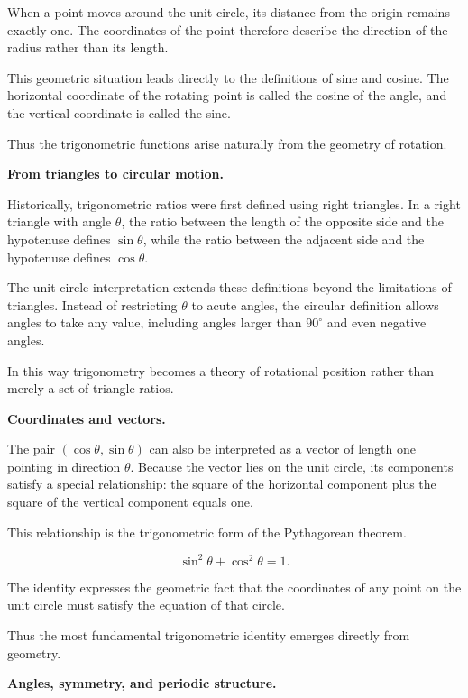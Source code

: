 \documentclass[11pt, openany]{book}
\theoremstyle{plain}
\theoremstyle{definition}
\theoremstyle{remark}
\begin{document}
When a point moves around the unit circle, its distance from the origin
remains exactly one. The coordinates of the point therefore describe the
direction of the radius rather than its length.

This geometric situation leads directly to the definitions of sine and
cosine. The horizontal coordinate of the rotating point is called the
cosine of the angle, and the vertical coordinate is called the sine.

Thus the trigonometric functions arise naturally from the geometry of
rotation.

\medskip

\textbf{From triangles to circular motion.}

Historically, trigonometric ratios were first defined using right
triangles. In a right triangle with angle $\theta$, the ratio between the
length of the opposite side and the hypotenuse defines $\sin\theta$,
while the ratio between the adjacent side and the hypotenuse defines
$\cos\theta$.

The unit circle interpretation extends these definitions beyond the
limitations of triangles. Instead of restricting $\theta$ to acute
angles, the circular definition allows angles to take any value,
including angles larger than $90^\circ$ and even negative angles.

In this way trigonometry becomes a theory of rotational position rather
than merely a set of triangle ratios.

\medskip

\textbf{Coordinates and vectors.}

The pair $(\cos\theta,\sin\theta)$ can also be interpreted as a vector of
length one pointing in direction $\theta$. Because the vector lies on the
unit circle, its components satisfy a special relationship: the square
of the horizontal component plus the square of the vertical component
equals one.

This relationship is the trigonometric form of the Pythagorean theorem.

\[
\sin^2\theta + \cos^2\theta = 1 .
\]

The identity expresses the geometric fact that the coordinates of any
point on the unit circle must satisfy the equation of that circle.

Thus the most fundamental trigonometric identity emerges directly from
geometry.

\medskip

\textbf{Angles, symmetry, and periodic structure.}
\end{document}
